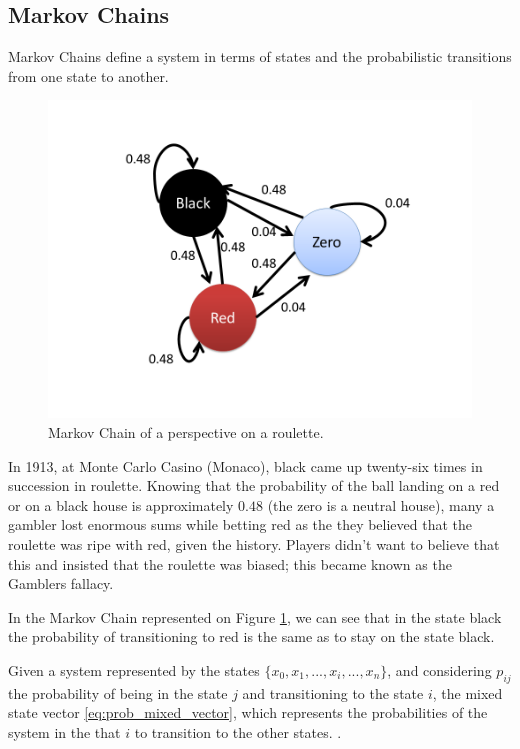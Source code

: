 \subsection{Markov Chains}
\label{subsub:MarkovChains}
Markov Chains define a system in terms of states and the probabilistic transitions from one state to another. 

\begin{figure}[h]
\centering 
\includegraphics[scale=0.30]{Figures/RouletteMC.png}
\caption{Markov Chain of a perspective on a roulette.}
\label{fig:roulette}
\end{figure}

In 1913, at Monte Carlo Casino (Monaco), black came up twenty-six times in succession in roulette. Knowing that the probability of the ball landing on a red or on a black house is approximately $0.48$ (the zero is a neutral house), many a gambler lost enormous sums while betting red as the they believed that the roulette was ripe with red, given the history. Players didn't want to believe that this and insisted that the roulette was biased; this became known as the Gamblers fallacy.


In the Markov Chain represented on Figure \ref{fig:roulette}, we can see that in the state black the probability of transitioning to red is the same as to stay on the state black.

Given a system represented by the states $\{ x_{0}, x_{1}, ..., x_{i}, ..., x_{n}\}$, and considering $ p_{ij}$ the probability of being in the state $j$ and transitioning to the state $i$, the mixed state vector \ref{eq:prob_mixed_vector}, which represents the probabilities of the system in the that $i$ to transition to the other states. .

